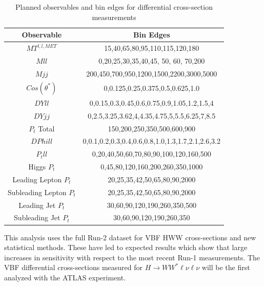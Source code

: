 \begin{table}[h!]
\begin{center}
\begin{tabular}{ |c||c|  }
 \hline
 Observable & Bin Edges\\
 \hline
 $MT^{l,l,MET}$ &15,40,65,80,95,110,115,120,180\\
 $Mll$&  0,20,25,30,35,40,45, 50, 60, 70,200\\
 $Mjj$ &200,450,700,950,1200,1500,2200,3000,5000\\
 $Cos(\theta^{*})$ &0,0.125,0.25,0.375,0.5,0.625,1.0\\
 $DYll$&   0,0.15,0.3,0.45,0.6,0.75,0.9,1.05,1.2,1.5,4\\
 $DYjj$& 0,2.5,3.25,3.62,4,4.35,4.75,5,5.5,6.25,7,8.5\\
 $P_{t}$ Total& 150,200,250,350,500,600,900\\
 $DPhill$& 0,0.1,0.2,0.3,0.4,0.6,0.8,1.0,1.3,1.7,2.1,2.6,3.2\\
 $P_{t} ll$&0,20,40,50,60,70,80,90,100,120,160,500\\
 Higgs $P_{t}$&0,45,80,120,160,200,260,350,1000\\
 Leading Lepton $P_{t}$&20,25,35,42,50,65,80,90,2000\\
 Subleading Lepton $P_{t}$&20,25,35,42,50,65,80,90,2000\\
 Leading Jet $P_{t}$&30,60,90,120,190,260,350,500\\
 Subleading Jet $P_{t}$& 30,60,90,120,190,260,350\\
 \hline
\end{tabular}
\end{center}
\caption{Planned observables and bin edges for differential cross-section measurements}
\label{tab:observablebins}
\end{table}

This analysis uses the full Run-2 dataset for VBF HWW cross-sections and new statistical methods. These have led to expected results which show that large increases in sensitivity with respect to the most recent Run-1 measurements. The VBF differential cross-sections measured for $H\rightarrow WW^*\ell\nu\ell\nu$ will be the first analyzed with the ATLAS experiment. 


